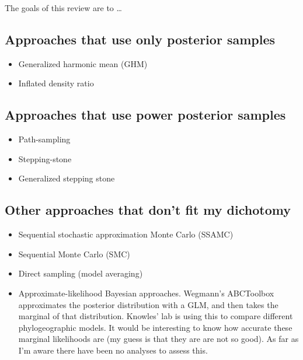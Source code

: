 The goals of this review are to \ldots

\subsection{Approaches that use only posterior samples}

\begin{itemize}
    \item Generalized harmonic mean (GHM) \citep{Gelfand1994}
    \item Inflated density ratio \citep{Arima2012}
\end{itemize}

\subsection{Approaches that use power posterior samples}

\begin{itemize}
    \item Path-sampling \citep{Lartillot2006}
    \item Stepping-stone \citep{Xie2011}
    \item Generalized stepping stone \citep{Fan2011}
\end{itemize}

\subsection{Other approaches that don't fit my dichotomy}

\begin{itemize}
    \item Sequential stochastic approximation Monte Carlo (SSAMC)
        \citep{Liang2007,Cheon2008}
    \item Sequential Monte Carlo (SMC) \citep{Jordan2012}
    \item Direct sampling (model averaging)
    \item Approximate-likelihood Bayesian approaches. Wegmann's ABCToolbox
        approximates the posterior distribution with a GLM, and then takes the
        marginal of that distribution. Knowles' lab is using this to compare
        different phylogeographic models. It would be interesting to know how
        accurate these marginal likelihoods are (my guess is that they are are
        not so good). As far as I'm aware there have been no analyses to assess
        this.
\end{itemize}
